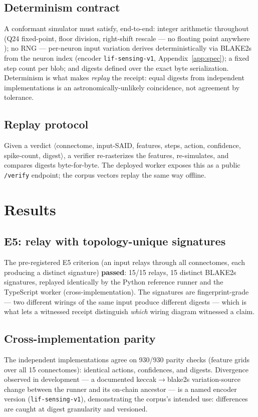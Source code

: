 \documentclass[pdflatex,sn-basic]{sn-jnl}
\begin{document}
\subsection{Determinism contract}
A conformant simulator must satisfy, end-to-end: integer arithmetic
throughout (Q24 fixed-point, floor division, right-shift rescale ---
no floating point anywhere \cite{goldberg1991}); no RNG --- per-neuron
input variation derives deterministically via BLAKE2s from the neuron
index (encoder \texttt{lif-sensing-v1}, Appendix~\ref{app:spec});
a fixed step count per blob; and digests defined over the exact byte
serialization. Determinism is what makes \emph{replay} the receipt:
equal digests from independent implementations is an
astronomically-unlikely coincidence, not agreement by tolerance.

\subsection{Replay protocol}
Given a verdict $\langle$connectome, input-SAID, features, steps,
action, confidence, spike-count, digest$\rangle$, a verifier
re-rasterizes the features, re-simulates, and compares digests
byte-for-byte. The deployed worker exposes this as a public
\texttt{/verify} endpoint; the corpus vectors replay the same way
offline.

\section{Results}\label{sec:results}
\subsection{E5: relay with topology-unique signatures}\label{sec:e5}
The pre-registered E5 criterion (an input relays through all
connectomes, each producing a distinct signature) \textbf{passed}:
15/15 relays, 15 distinct BLAKE2s signatures, replayed identically by
the Python reference runner and the TypeScript worker
(cross-implementation). The signatures are fingerprint-grade ---
two different wirings of the same input produce different digests ---
which is what lets a witnessed receipt distinguish \emph{which}
wiring diagram witnessed a claim.

\subsection{Cross-implementation parity}
The independent implementations agree on 930/930 parity checks
(feature grids over all 15 connectomes): identical actions,
confidences, and digests. Divergence observed in development ---
a documented keccak$\to$blake2s variation-source change between the
runner and its on-chain ancestor --- is a named encoder version
(\texttt{lif-sensing-v1}), demonstrating the corpus's intended use:
differences are caught at digest granularity and versioned.
\end{document}

